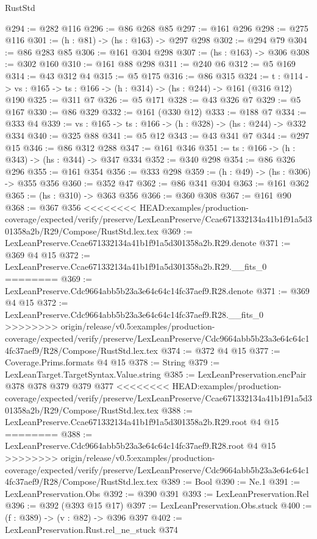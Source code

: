 \begin{lexlean}{RustStd}
\begin{coremodule}
{\begin{coremodule}
@294 := @282 @116
@296 := @86 @268 @85
@297 := @161 @296
@298 := @275 @116
@301 := (h : @81) -> (hs : @163) -> @297 @298
@302 := @294 @79
@304 := @86 @283 @85
@306 := @161 @304 @298
@307 := (hs : @163) -> @306
@308 := @302 @160
@310 := @161 @88 @298
@311 := @240 @6
@312 := @5 @169
@314 := @43 @312 @4
@315 := @5 @175
@316 := @86 @315
@324 := {t : @114} ->
  {vs : @165} -> {ts : @166} -> (h : @314) -> (hs : @244) -> @161 (@316 @12) @190
@325 := @311 @7
@326 := @5 @171
@328 := @43 @326 @7
@329 := @5 @167
@330 := @86 @329
@332 := @161 (@330 @12)
@333 := @188 @7
@334 := @333 @4
@339 := {vs : @165} -> {ts : @166} -> (h : @328) -> (hs : @244) -> @332 @334
@340 := @325 @88
@341 := @5 @12
@343 := @43 @341 @7
@344 := @297 @15
@346 := @86 @312 @288
@347 := @161 @346
@351 := {ts : @166} -> (h : @343) -> (hs : @344) -> @347 @334
@352 := @340 @298
@354 := @86 @326 @296
@355 := @161 @354
@356 := @333 @298
@359 := (h : @49) -> (hs : @306) -> @355 @356
@360 := @352 @47
@362 := @86 @341 @304
@363 := @161 @362
@365 := (hs : @310) -> @363 @356
@366 := @360 @308
@367 := @161 @90
@368 := @367 @356
<<<<<<<< HEAD:examples/production-coverage/expected/verify/preserve/LexLeanPreserve/Ccae671332134a41b1f91a5d301358a2b/R29/Compose/RustStd.lex.tex
@369 := LexLeanPreserve.Ccae671332134a41b1f91a5d301358a2b.R29.denote
@371 := @369 @4 @15
@372 := LexLeanPreserve.Ccae671332134a41b1f91a5d301358a2b.R29.__fits_0
========
@369 := LexLeanPreserve.Cdc9664abb5b23a3e64c64c14fc37aef9.R28.denote
@371 := @369 @4 @15
@372 := LexLeanPreserve.Cdc9664abb5b23a3e64c64c14fc37aef9.R28.__fits_0
>>>>>>>> origin/release/v0.5:examples/production-coverage/expected/verify/preserve/LexLeanPreserve/Cdc9664abb5b23a3e64c64c14fc37aef9/R28/Compose/RustStd.lex.tex
@374 := @372 @4 @15
@377 := Coverage.Prims.formats @4 @15
@378 := String
@379 := LexLeanTarget.TargetSyntax.Value.string
@385 := LexLeanPreservation.encPair @378 @378 @379 @379 @377
<<<<<<<< HEAD:examples/production-coverage/expected/verify/preserve/LexLeanPreserve/Ccae671332134a41b1f91a5d301358a2b/R29/Compose/RustStd.lex.tex
@388 := LexLeanPreserve.Ccae671332134a41b1f91a5d301358a2b.R29.root @4 @15
========
@388 := LexLeanPreserve.Cdc9664abb5b23a3e64c64c14fc37aef9.R28.root @4 @15
>>>>>>>> origin/release/v0.5:examples/production-coverage/expected/verify/preserve/LexLeanPreserve/Cdc9664abb5b23a3e64c64c14fc37aef9/R28/Compose/RustStd.lex.tex
@389 := Bool
@390 := Ne.{1}
@391 := LexLeanPreservation.Obs
@392 := @390 @391
@393 := LexLeanPreservation.Rel
@396 := @392 (@393 @15 @17)
@397 := LexLeanPreservation.Obs.stuck
@400 := (f : @389) -> (v : @82) -> @396 @397
@402 := LexLeanPreservation.Rust.rel_ne_stuck @374

\end{coremodule}}
\end{coremodule}
\end{lexlean}
